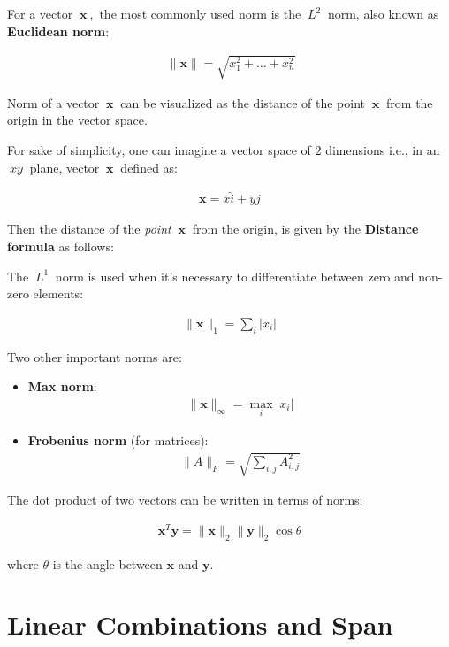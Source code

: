 \documentclass[12pt]{article}
\begin{document}
For a vector $\ \mathbf{x} \ ,$ the most commonly used norm is the $\ L^{2} \ $ norm, also known as \textbf{Euclidean norm}:

\begin{align}
\ \|\mathbf{x}\| = \sqrt{x_1^2 + \dots + x_n^2}
\end{align}

Norm of a vector $\ \mathbf{x} \ $ can be visualized as the distance of the point $\ \mathbf{x} \ $ from the origin in the vector space.

For sake of simplicity, one can imagine a vector space of $2$ dimensions i.e., in an $\ xy\ $ plane, vector $\ \mathbf{x} \ $ defined as:

\begin{align}
\mathbf{x} = x \hat{i} + y \hat{j}
\end{align}

Then the distance of the \textit{point} $\ \mathbf{x} \ $ from the origin, is given by the \textbf{Distance formula} as follows:

The $\ L^{1} \ $ norm is used when it's necessary to differentiate between zero and non-zero elements:

\begin{align}
\|\mathbf{x}\|_{1} = \sum_{i} \left|x_{i}\right|
\end{align}

Two other important norms are:

\begin{itemize}
    \item \textbf{Max norm}:
    \begin{align}
    \|\mathbf{x}\|_{\infty} = \max_{i} \left|x_{i}\right|
    \end{align}
    \item \textbf{Frobenius norm} (for matrices):
    \begin{align}
    \|A\|_{F} = \sqrt{\sum_{i,j}A^{2}_{i,j}}
    \end{align}
\end{itemize}

The dot product of two vectors can be written in terms of norms:

\begin{align}
\mathbf{x}^{T}\mathbf{y} = \|\mathbf{x}\|_{2}\|\mathbf{y}\|_{2}\cos\theta
\end{align}

where $\theta$ is the angle between $\mathbf{x}$ and $\mathbf{y}$.

\section{Linear Combinations and Span}
\end{document}
